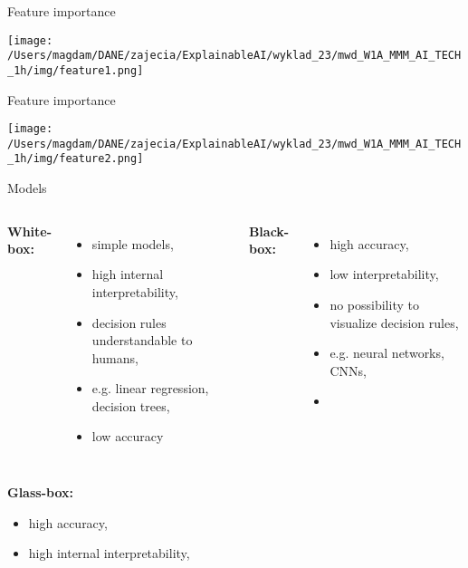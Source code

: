 \documentclass{beamer}
\begin{document}
\begin{frame}{Feature importance}
\begin{center}
\texttt{[image: /Users/magdam/DANE/zajecia/ExplainableAI/wyklad\_23/mwd\_W1A\_MMM\_AI\_TECH\_1h/img/feature1.png]} 
\end{center}
\end{frame}

\begin{frame}{Feature importance}
\begin{center}
\texttt{[image: /Users/magdam/DANE/zajecia/ExplainableAI/wyklad\_23/mwd\_W1A\_MMM\_AI\_TECH\_1h/img/feature2.png]} 
\end{center}
\end{frame}

\begin{frame}{Models}
\begin{columns}
\textbf{White-box:}
\begin{itemize}
\item simple models,
\item high internal interpretability,
\item decision rules understandable to humans,
\item e.g. linear regression, decision trees,
\item low accuracy
\end{itemize}
\textbf{Black-box:}
\begin{itemize}
\item high accuracy,
\item low interpretability,
\item no possibility to visualize decision rules,
\item e.g. neural networks, CNNs,
\item 
\end{itemize}
\end{columns}
\vspace{1em}
\textbf{Glass-box:}
\begin{itemize}
\item high accuracy,
\item high internal interpretability,
\end{itemize}
\end{frame}
\end{document}
